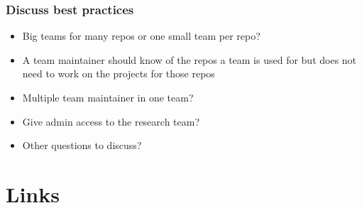 \documentclass[aspectratio=169]{beamer} %
\begin{document}
\begin{frame}
	\frametitle{Discuss best practices}
	
	\begin{itemize}
		\item Big teams for many repos or one small team per repo?
		\item A team maintainer should know of the repos a team is used for but does not need to work on the projects for those repos
		\item Multiple team maintainer in one team?
		\item Give admin access to the research team?
		\item Other questions to discuss?
	\end{itemize}
	
\end{frame}


\section{Links}




\end{document}
